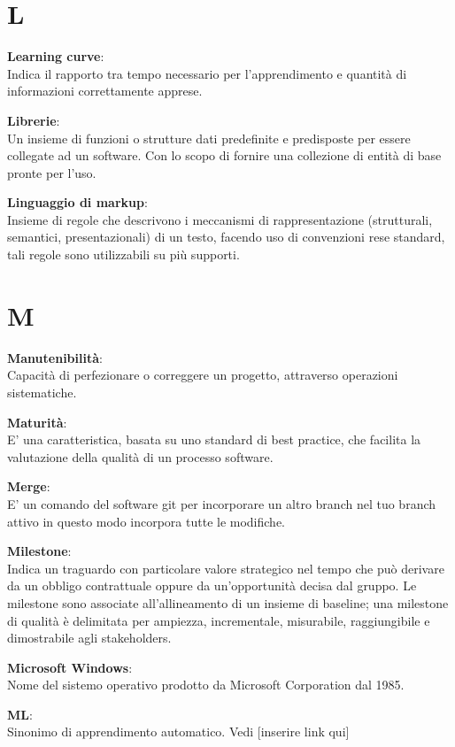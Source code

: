 \documentclass[a4paper, oneside, openany, dvipsnames, table]{article}
\begin{document}
\newpage
\section{L}
\textbf{Learning curve}:\\ Indica il rapporto tra tempo necessario per l'apprendimento e quantità di informazioni correttamente apprese.

\textbf{Librerie}:\\	Un insieme di funzioni o strutture dati predefinite e predisposte per essere collegate ad un software. Con lo scopo di fornire una collezione di entità di base pronte per l'uso.

\textbf{Linguaggio di markup}:\\	 Insieme di regole che descrivono i meccanismi di rappresentazione (strutturali, semantici, presentazionali) di un testo, facendo uso di convenzioni rese standard, tali regole sono utilizzabili su più supporti.

\newpage
\section{M}
\textbf{Manutenibilità}:\\	Capacità di perfezionare o correggere un progetto, attraverso operazioni sistematiche.

\textbf{Maturità}:\\	E' una caratteristica, basata su uno standard di best practice, che facilita la valutazione della qualità di un processo software. 

\textbf{Merge}:\\	E' un comando del software git per incorporare un altro branch nel tuo branch attivo in questo modo incorpora tutte le modifiche.

\textbf{Milestone}:\\Indica un traguardo con particolare valore strategico nel tempo che può derivare da un obbligo contrattuale oppure da un'opportunità decisa dal gruppo. Le milestone sono associate all'allineamento di un insieme di baseline; una milestone di qualità è delimitata per ampiezza, incrementale, misurabile, raggiungibile e dimostrabile agli stakeholders.


\textbf{Microsoft Windows}:\\Nome del sistemo operativo prodotto da Microsoft Corporation dal 1985.

\textbf{ML}:\\Sinonimo di apprendimento automatico. Vedi [inserire link qui]
\end{document}
